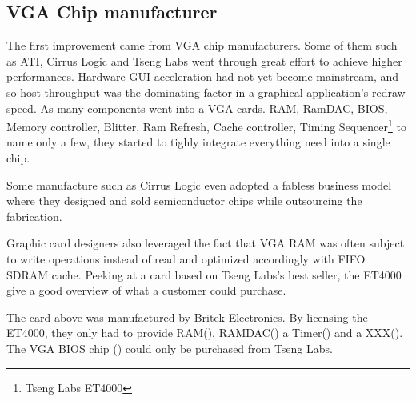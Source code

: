\subsection{VGA Chip manufacturer}
The first improvement came from VGA chip manufacturers. Some of them such as ATI, Cirrus Logic and Tseng Labs went through great effort to achieve higher performances. Hardware GUI acceleration had not yet become mainstream, and so host-throughput was the dominating factor in a graphical-application's redraw speed. As many components went into a VGA cards. RAM, RamDAC, BIOS, Memory controller, Blitter, Ram Refresh, Cache controller, Timing Sequencer\footnote{Tseng Labs ET4000} to name only a few, they started to tighly integrate everything need into a single chip.\\
\par
Some manufacture such as Cirrus Logic even adopted a fabless business model where they designed and sold semiconductor chips while outsourcing the fabrication.\\
\par
Graphic card designers also leveraged the fact that VGA RAM was often subject to write operations instead of read and optimized accordingly with FIFO SDRAM cache. Peeking at a card based on Tseng Labs's best seller, the ET4000 give a good overview of what a customer could purchase.\\ 
\par
{}
\par
The card above was manufactured by Britek Electronics. By licensing the ET4000, they only had to provide RAM(), RAMDAC() a Timer() and a XXX(). The VGA BIOS chip () could only be purchased from Tseng Labs.\\
\par
{}

\par



